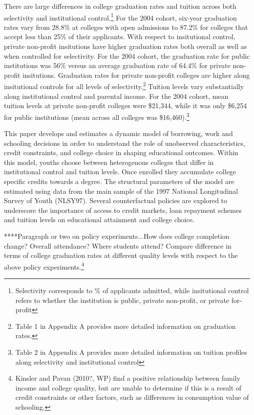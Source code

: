 \documentclass[letterpaper,12pt]{article}
\begin{document}
There are large differences in college graduation rates and tuition across both selectivity and institutional control.\footnote{Selectivity corresponds to \% of applicants admitted, while insitutional control refers to whether the institution is public, private non-profit, or private for-profit} For the 2004 cohort, six-year graduation rates vary from 28.8\% at colleges with open admissions to 87.2\% for colleges that accept less than 25\% of their applicants. With respect to insitutional control, private non-profit insitutions have higher graduation rates both overall as well as when controlled for selectivity. For the 2004 cohort, the graduation rate for public institutions was 56\% versus an average graduation rate of 64.4\% for private non-profit insitutions. Graduation rates for private non-profit colleges are higher along insitutional controls for all levels of selectivity.\footnote{Table 1 in Appendix A provides more detailed information on graduation rates.} Tuition levels vary substantially along institutional control and parental income. For the 2004 cohort, mean tuition levels at private non-profit colleges were \$21,344, while it was only \$6,254 for public institutions (mean across all colleges was \$16,460).\footnote{Table 2 in Appendix A provides more detailed information on tuition profiles along selectivity and institutional control} 

This paper develops and estimates a dynamic model of borrowing, work and schooling decisions in order to understand the role of unobserved characteristics, credit constraints, and college choice in shaping educational outcomes. Within this model, youths choose between heterogenous colleges that differ in institutional control and tuition levels. Once enrolled they accumulate college specific credits towards a degree. The structural parameters of the model are estimated using data from the main sample of the 1997 National Longitudinal Survey of Youth (NLSY97). Several counterfactual policies are explored to underscore the importance of access to credit markets, loan repayment schemes and tuition levels on educational attainment and college choice. 

****Paragraph or two on policy experiments...How does college completion change? Overall attendance? Where students attend? Compare difference in terms of college graduation rates at different quality levels with respect to the above policy experiments.\footnote{Kinsler and Pavan (2010?, WP) find a positive relationship between family income and college quality, but are unable to determine if this is a result of credit constraints or other factors, such as differences in consumption value of schooling.}
\end{document}
